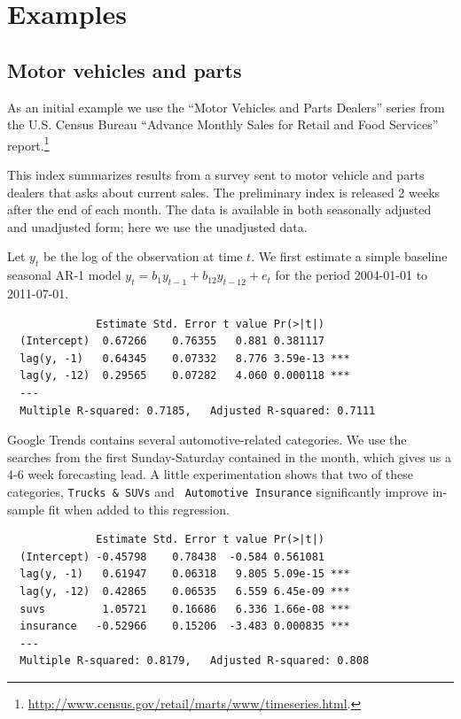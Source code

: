 \documentclass[12pt, oneside]{article}
\begin{document}
\section{Examples}

\subsection{Motor vehicles and parts}
As an initial example we use the ``Motor Vehicles and Parts Dealers''
series from the U.S. Census Bureau ``Advance Monthly Sales for Retail
and Food Services'' report.\footnote{\url{http://www.census.gov/retail/marts/www/timeseries.html}.}

This index summarizes results from a survey sent to motor vehicle and
parts dealers that asks about current sales.  The preliminary index is
released 2 weeks after the end of each month.  The data is available
in both seasonally adjusted and unadjusted form; here we use the
unadjusted data.  

Let $y_t$ be the log of the observation at time $t$.  We first
estimate a simple baseline seasonal AR-1 model $y_t = b_1y_{t-1} +
b_{12} y_{t-12} + e_t$ for the period 2004-01-01 to 2011-07-01.
\small
\begin{verbatim}
              Estimate Std. Error t value Pr(>|t|)    
  (Intercept)  0.67266    0.76355   0.881 0.381117    
  lag(y, -1)   0.64345    0.07332   8.776 3.59e-13 ***
  lag(y, -12)  0.29565    0.07282   4.060 0.000118 ***
  ---
  Multiple R-squared: 0.7185,	Adjusted R-squared: 0.7111 
\end{verbatim}
\normalsize

Google Trends contains several automotive-related categories.  We use
the searches from the first Sunday-Saturday contained in the month,
which gives us a 4-6 week forecasting lead.  A little experimentation
shows that two of these categories, {\tt Trucks \& SUVs} and {\tt
  Automotive Insurance} significantly improve in-sample fit when added
to this regression.

\small
\begin{verbatim}
              Estimate Std. Error t value Pr(>|t|)    
  (Intercept) -0.45798    0.78438  -0.584 0.561081    
  lag(y, -1)   0.61947    0.06318   9.805 5.09e-15 ***
  lag(y, -12)  0.42865    0.06535   6.559 6.45e-09 ***
  suvs         1.05721    0.16686   6.336 1.66e-08 ***
  insurance   -0.52966    0.15206  -3.483 0.000835 ***
  ---
  Multiple R-squared: 0.8179,	Adjusted R-squared: 0.808 
\end{verbatim}
\normalsize
\end{document}
